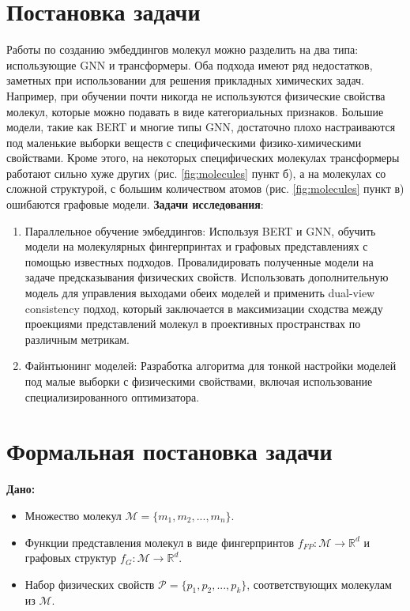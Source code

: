 \section{Постановка задачи}
\label{sec:Chapter1} 

Работы по созданию эмбеддингов молекул можно разделить на два типа: использующие GNN и трансформеры. Оба подхода имеют ряд недостатков, заметных при использовании для решения прикладных химических задач. Например, при обучении почти никогда не используются физические свойства молекул, которые можно подавать в виде категориальных признаков. Большие модели, такие как BERT и многие типы GNN, достаточно плохо настраиваются под маленькие выборки веществ с специфическими физико-химическими свойствами. Кроме этого, на некоторых специфических молекулах трансформеры работают сильно хуже других (рис. \ref{fig:molecules} пункт б), а на молекулах со сложной структурой, с большим количеством атомов (рис. \ref{fig:molecules} пункт в) ошибаются графовые модели.
\newline
\textbf{Задачи исследования}:
\begin{enumerate}
    \setlength{\itemsep}{\smallskipamount}
    \item Параллельное обучение эмбеддингов: Используя BERT и GNN, обучить модели на молекулярных фингерпринтах и графовых представлениях с помощью известных подходов. Провалидировать полученные модели на задаче предсказывания физических свойств. Использовать дополнительную модель для управления выходами обеих моделей и применить dual-view consistency подход, который заключается в максимизации сходства между проекциями представлений молекул в проективных пространствах по различным метрикам.
    \item Файнтьюнинг моделей: Разработка алгоритма для тонкой настройки моделей под малые выборки с физическими свойствами, включая использование специализированного оптимизатора.
\end{enumerate}

\section*{Формальная постановка задачи}

\textbf{Дано:}
\begin{itemize}
  \item Множество молекул \( \mathcal{M} = \{m_1, m_2, ..., m_n\} \).
  \item Функции представления молекул в виде фингерпринтов \( f_{FP}: \mathcal{M} \rightarrow \mathbb{R}^d \) и графовых структур \( f_{G}: \mathcal{M} \rightarrow \mathbb{R}^d \).
  \item Набор физических свойств \( \mathcal{P} = \{p_1, p_2, ..., p_k\} \), соответствующих молекулам из \( \mathcal{M} \).
\end{itemize}

